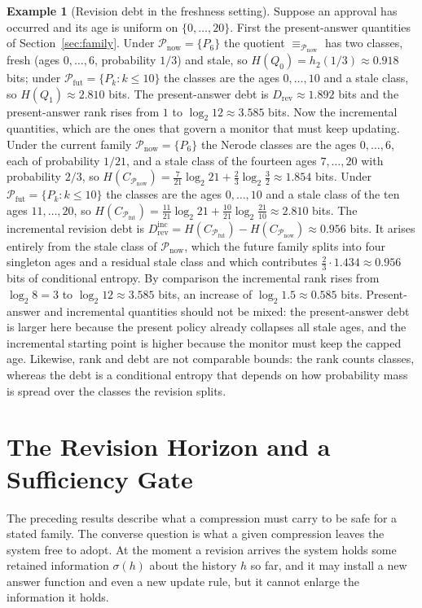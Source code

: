 \documentclass[11pt]{article}
\theoremstyle{definition}
\newtheorem{example}{Example}
\theoremstyle{remark}
\newcommand{\Fut}{\mathcal{P}_{\mathrm{fut}}}
\newcommand{\Now}{\mathcal{P}_{\mathrm{now}}}
\newcommand{\eqv}[1]{\equiv_{#1}}
\begin{document}
\begin{example}[Revision debt in the freshness setting]\label{ex:debt}
Suppose an approval has occurred and its age is uniform on $\{0,\dots,20\}$. First the present-answer quantities of Section~\ref{sec:family}. Under $\Now=\{P_6\}$ the quotient $\eqv{\Now}$ has two classes, fresh (ages $0,\dots,6$, probability $1/3$) and stale, so $H(Q_0)=h_2(1/3)\approx0.918$ bits; under $\Fut=\{P_k:k\le10\}$ the classes are the ages $0,\dots,10$ and a stale class, so $H(Q_1)\approx2.810$ bits. The present-answer debt is $D_{\mathrm{rev}}\approx1.892$ bits and the present-answer rank rises from $1$ to $\log_2 12\approx3.585$ bits. Now the incremental quantities, which are the ones that govern a monitor that must keep updating. Under the current family $\Now=\{P_6\}$ the Nerode classes are the ages $0,\dots,6$, each of probability $1/21$, and a stale class of the fourteen ages $7,\dots,20$ with probability $2/3$, so $H(C_{\Now})=\tfrac{7}{21}\log_2 21+\tfrac{2}{3}\log_2\tfrac32\approx1.854$ bits. Under $\Fut=\{P_k:k\le10\}$ the classes are the ages $0,\dots,10$ and a stale class of the ten ages $11,\dots,20$, so $H(C_{\Fut})=\tfrac{11}{21}\log_2 21+\tfrac{10}{21}\log_2\tfrac{21}{10}\approx2.810$ bits. The incremental revision debt is $D^{\mathrm{inc}}_{\mathrm{rev}}=H(C_{\Fut})-H(C_{\Now})\approx0.956$ bits. It arises entirely from the stale class of $\Now$, which the future family splits into four singleton ages and a residual stale class and which contributes $\tfrac23\cdot1.434\approx0.956$ bits of conditional entropy. By comparison the incremental rank rises from $\log_2 8=3$ to $\log_2 12\approx3.585$ bits, an increase of $\log_2 1.5\approx0.585$ bits. Present-answer and incremental quantities should not be mixed: the present-answer debt is larger here because the present policy already collapses all stale ages, and the incremental starting point is higher because the monitor must keep the capped age. Likewise, rank and debt are not comparable bounds: the rank counts classes, whereas the debt is a conditional entropy that depends on how probability mass is spread over the classes the revision splits.
\end{example}

\section{The Revision Horizon and a Sufficiency Gate}\label{sec:horizon}

The preceding results describe what a compression must carry to be safe for a stated family. The converse question is what a given compression leaves the system free to adopt. At the moment a revision arrives the system holds some retained information $\sigma(h)$ about the history $h$ so far, and it may install a new answer function and even a new update rule, but it cannot enlarge the information it holds.
\end{document}
